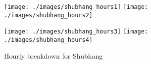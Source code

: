 \begin{figure}[H]
	\centering
	\texttt{[image: ./images/shubhang\_hours1]}
	\texttt{[image: ./images/shubhang\_hours2]}
\end{figure}
\begin{figure}[H]
	\centering
	\texttt{[image: ./images/shubhang\_hours3]}
	\texttt{[image: ./images/shubhang\_hours4]}
	\caption{Hourly breakdown for Shubhang}
\end{figure}